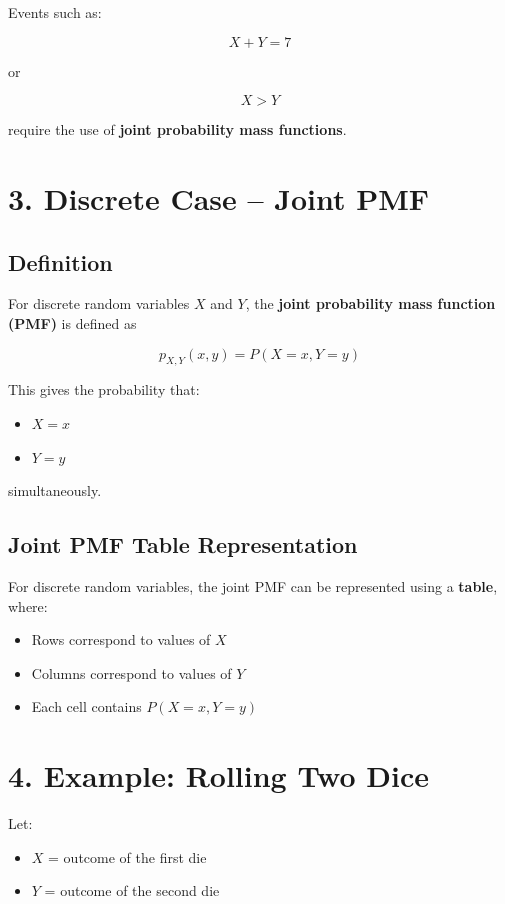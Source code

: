 \documentclass{article}
\begin{document}
Events such as:

\[
X + Y = 7
\]

or

\[
X > Y
\]

require the use of \textbf{joint probability mass functions}.

\section*{3. Discrete Case -- Joint PMF}

\subsection*{Definition}

For discrete random variables $X$ and $Y$, the \textbf{joint probability mass function (PMF)} is defined as

\[
p_{X,Y}(x,y) = P(X = x, Y = y)
\]

This gives the probability that:

\begin{itemize}
\item $X = x$
\item $Y = y$
\end{itemize}

simultaneously.

\subsection*{Joint PMF Table Representation}

For discrete random variables, the joint PMF can be represented using a \textbf{table}, where:

\begin{itemize}
\item Rows correspond to values of $X$
\item Columns correspond to values of $Y$
\item Each cell contains $P(X=x, Y=y)$
\end{itemize}

\section*{4. Example: Rolling Two Dice}

Let:

\begin{itemize}
\item $X$ = outcome of the first die
\item $Y$ = outcome of the second die
\end{itemize}
\end{document}
